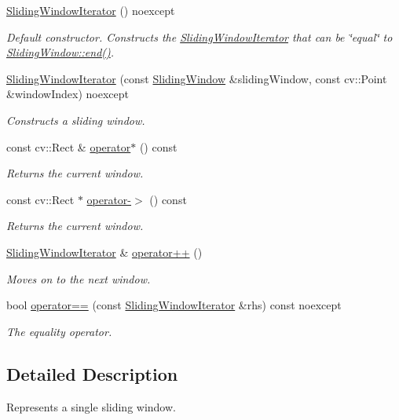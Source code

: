 \begin{DoxyCompactItemize}
\item 
\hyperlink{group___imagery_module_gaa72789bec6d0d49fe87408e224739d23}{Sliding\+Window\+Iterator} () noexcept
\begin{DoxyCompactList}\small\item\em Default constructor. Constructs the \hyperlink{classdg_1_1deepcore_1_1imagery_1_1_sliding_window_iterator}{Sliding\+Window\+Iterator} that can be \char`\"{}equal\char`\"{} to \hyperlink{group___imagery_module_ga1c962ee19d65114b9213d2aea33503a6}{Sliding\+Window\+::end()}. \end{DoxyCompactList}\item 
\hyperlink{group___imagery_module_ga7493aa55008e090f05fcb47bd53d6098}{Sliding\+Window\+Iterator} (const \hyperlink{classdg_1_1deepcore_1_1imagery_1_1_sliding_window}{Sliding\+Window} \&sliding\+Window, const cv\+::\+Point \&window\+Index) noexcept
\begin{DoxyCompactList}\small\item\em Constructs a sliding window. \end{DoxyCompactList}\item 
const cv\+::\+Rect \& \hyperlink{group___imagery_module_gac4ebab49e1019b197708fa07ddf8a550}{operator$\ast$} () const 
\begin{DoxyCompactList}\small\item\em Returns the current window. \end{DoxyCompactList}\item 
const cv\+::\+Rect $\ast$ \hyperlink{group___imagery_module_ga72f982e7452565b8b39edcfd3e81e2b8}{operator-\/$>$} () const 
\begin{DoxyCompactList}\small\item\em Returns the current window. \end{DoxyCompactList}\item 
\hyperlink{classdg_1_1deepcore_1_1imagery_1_1_sliding_window_iterator}{Sliding\+Window\+Iterator} \& \hyperlink{group___imagery_module_ga7b899de397aefb4987bcb989f3cb33d4}{operator++} ()
\begin{DoxyCompactList}\small\item\em Moves on to the next window. \end{DoxyCompactList}\item 
bool \hyperlink{group___imagery_module_gaf2d1d266e7176885e054f28bbdec7c61}{operator==} (const \hyperlink{classdg_1_1deepcore_1_1imagery_1_1_sliding_window_iterator}{Sliding\+Window\+Iterator} \&rhs) const noexcept
\begin{DoxyCompactList}\small\item\em The equality operator. \end{DoxyCompactList}\end{DoxyCompactItemize}


\subsection{Detailed Description}
Represents a single sliding window. 